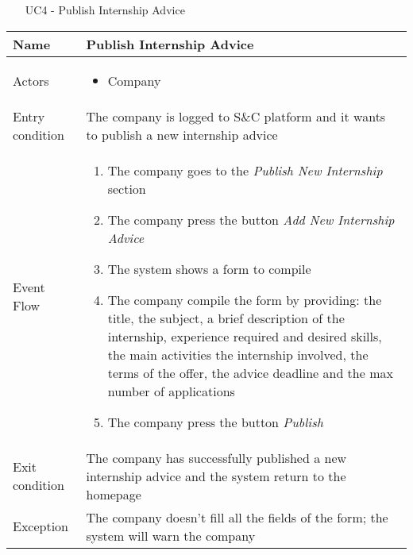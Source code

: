 			\begin{table} [H]
				\centering
					\begin{itemize}
					\item [UC4] - Publish Internship Advice
				\end{itemize}
				\begin{tabular}{|| P{7.5cm} | P{7.5cm} ||}
					\hline
					Name & Publish Internship Advice \\
					\hline
					Actors & \parbox{5cm}{\begin{itemize}
							\item Company
						\end{itemize}
					} \\
					\hline
					Entry condition & The company is logged to S\&C platform and it wants to publish a new internship advice \\
					\hline
					Event Flow & \parbox{5cm}{\begin{enumerate}
							\item The company goes to the \textit{Publish 
							New Internship} section
							\item The company press the button \textit{Add 
							New Internship Advice} 
							\item The system shows a form to compile
							\item The company compile the form by 
							providing: the title, the subject, a 
							brief description of the internship, 
							experience required and desired 
							skills, the main activities the 
							internship involved, the terms of the 
							offer, the advice deadline and the 
							max number of applications
							\item The company press the button 
							\textit{Publish}
					\end{enumerate}} \\
					\hline 
					Exit condition & The company has successfully published a 
					new internship advice and the system 
					return to the homepage  \\
					\hline
					Exception & The company doesn’t fill all the 
					fields of the form; the system will 
					warn the company \\
					\hline
				\end{tabular}
				\end{table}
				
				
				
